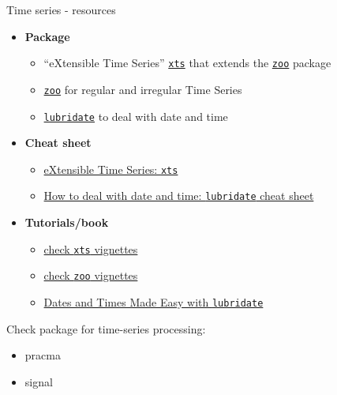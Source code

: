 \documentclass[8pt,ignorenonframetext,]{beamer}
\providecommand{\tightlist}{%
  \setlength{\itemsep}{0pt}\setlength{\parskip}{0pt}}
\begin{document}
\begin{frame}[fragile]{Time series - resources}

\begin{itemize}
\tightlist
\item
  \textbf{Package}

  \begin{itemize}
  \tightlist
  \item
    ``eXtensible Time Series''
    \href{https://cran.r-project.org/web/packages/xts/index.html}{\texttt{xts}}
    that extends the
    \href{https://cran.r-project.org/web/packages/zoo/index.html}{\texttt{zoo}}
    package
  \item
    \href{https://cran.r-project.org/web/packages/zoo/index.html}{\texttt{zoo}}
    for regular and irregular Time Series
  \item
    \href{https://cran.r-project.org/web/packages/lubridate/index.html}{\texttt{lubridate}}
    to deal with date and time
  \end{itemize}
\item
  \textbf{Cheat sheet}

  \begin{itemize}
  \tightlist
  \item
    \href{https://s3.amazonaws.com/assets.datacamp.com/blog_assets/xts_Cheat_Sheet_R.pdf}{eXtensible
    Time Series: \texttt{xts}}
  \item
    \href{https://github.com/rstudio/cheatsheets/raw/master/lubridate.pdf}{How
    to deal with date and time: \texttt{lubridate} cheat sheet}
  \end{itemize}
\item
  \textbf{Tutorials/book}

  \begin{itemize}
  \tightlist
  \item
    \href{https://cran.r-project.org/web/packages/xts/index.html}{check
    \texttt{xts} vignettes}
  \item
    \href{https://cran.r-project.org/web/packages/zoo/index.html}{check
    \texttt{zoo} vignettes}
  \item
    \href{http://vita.had.co.nz/papers/lubridate.pdf}{Dates and Times
    Made Easy with \texttt{lubridate}}
  \end{itemize}
\end{itemize}

Check package for time-series processing:

\begin{itemize}
\tightlist
\item
  pracma
\item
  signal
\end{itemize}

\end{frame}
\end{document}
